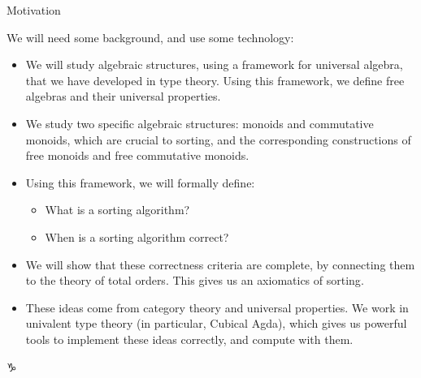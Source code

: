 \documentclass[9pt]{beamer}
\begin{document}
\begin{frame}{Motivation}

  We will need some background, and use some technology:

\begin{itemize}

  \item We will study algebraic structures, using a framework for \alert{universal algebra}, that we have developed in type theory. Using this framework, we define free algebras and their universal properties.

  \item We study two specific algebraic structures: \alert{monoids} and \alert{commutative monoids}, which are crucial to sorting, and the corresponding constructions of \alert{free monoids} and \alert{free commutative monoids}.

  \item Using this framework, we will formally define:
    \begin{itemize}
        \item What is a sorting algorithm?
        \item When is a sorting algorithm correct?
    \end{itemize}

  \item We will show that these correctness criteria are complete, by connecting them to the theory of \alert{total orders}. This gives us an \alert{axiomatics of sorting}.

  \item These ideas come from category theory and universal properties. We work in univalent type theory (in particular, \alert{Cubical Agda}), which gives us powerful tools to implement these ideas correctly, and compute with them.
  

\end{itemize}
♑
\end{frame}
\end{document}
